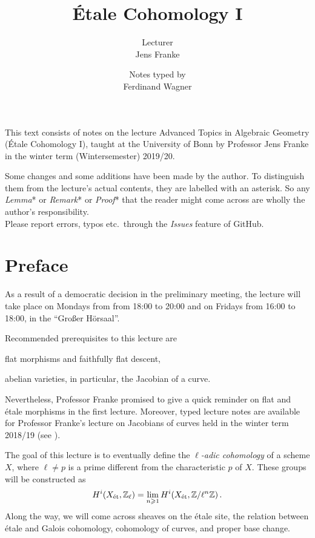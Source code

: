 \documentclass[a4paper, 10pt, oneside, DIV=9, chapterprefix=true, numbers=enddot, bibliography=totoc]{scrbook}
\title{Étale Cohomology I}
\author{{\normalsize Lecturer}\\
	Jens Franke}
\date{{\normalsize Notes typed by}\\
	Ferdinand Wagner}
\begin{document}
\frontmatter
{}
\maketitle
\noindent This text consists of notes on the lecture Advanced Topics in Algebraic Geometry (Étale Cohomology I), taught at the University of
Bonn by Professor Jens Franke in the winter term (Wintersemester) 2019/20.

Some changes and some additions have been made by the author. To distinguish them from the lecture's actual contents, they are labelled with an asterisk. So any \emph{Lemma}* or \emph{Remark}* or \emph{Proof}* that the reader might come across are wholly the author's responsibility.\\[\thmsep]Please report errors, typos etc.\ through the \emph{Issues} feature of GitHub.


\tableofcontents
{}
\chapter{Preface}
As a result of a democratic decision in the preliminary meeting, the lecture will take place on Mondays from from 18:00 to 20:00 and on Fridays from 16:00 to 18:00, in the \enquote{Großer Hörsaal}.

Recommended prerequisites to this lecture are
\begin{temize}
	\item flat morphisms and faithfully flat descent,
	\item abelian varieties, in particular, the Jacobian of a curve.
\end{temize}
Nevertheless, Professor Franke promised to give a quick reminder on flat and étale morphisms in the first lecture. Moreover, typed lecture notes are available for Professor Franke's lecture on Jacobians of curves held in the winter term 2018/19 (see \cite{jacobians}). 

The goal of this lecture is to eventually define the \emph{$\ell$-adic cohomology} of a scheme $X$, where $\ell\neq p$ is a prime different from the characteristic $p$ of $X$. These groups will be constructed as
\begin{align*}
	H^i(X_{\mathrm{\acute{e}t}},\mathbb{Z}_\ell)=\operatorname*{lim}_{n\geqslant 1}H^i(X_{\mathrm{\acute{e}t}},\mathbb{Z}/\ell^n\mathbb{Z})\,.
\end{align*}
Along the way, we will come across sheaves on the étale site, the relation between étale and Galois cohomology, cohomology of curves, and proper base change.
\end{document}
